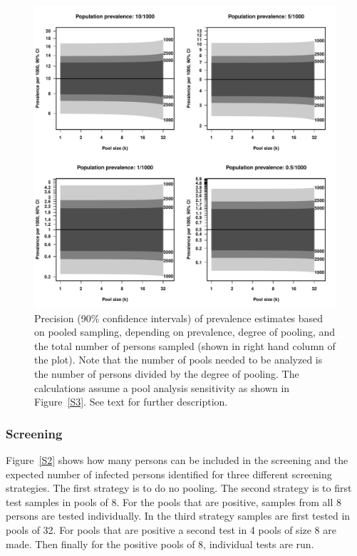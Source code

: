 \documentclass[10pt]{article}
\begin{document}
\begin{figure}[!hbt]
\begin{center}
\includegraphics[width=0.9\linewidth]{prevalences_CI.pdf}
\end{center}
\caption{Precision (90\% confidence intervals) of prevalence estimates based on pooled sampling, depending on prevalence, degree of pooling, and the total number of persons sampled (shown in right hand column of the plot). Note that the number of pools needed to be analyzed is the number of persons divided by the degree of pooling. The calculations assume a pool analysis sensitivity as shown in Figure~\ref{S3}. See text for further description.}
\label{S1}
\end{figure}

\subsubsection*{Screening}

Figure~\ref{S2} shows how many persons can be included in the screening and the expected number of infected persons identified for three different screening strategies. The first strategy is to do no pooling. The second strategy is to first test samples in pools of 8. For the pools that are positive, samples from all 8 persons are tested individually. In the third strategy samples are first tested in pools of 32. For pools that are positive a second test in 4 pools of size 8 are made. Then finally for the positive pools of 8, individual tests are run. 
\end{document}
